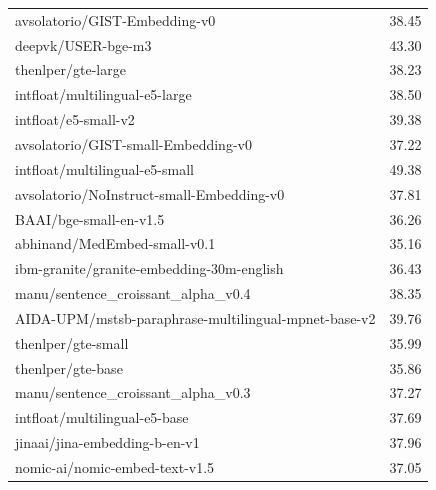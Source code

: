 \begin{xltabular}{\textwidth}{X c}
    avsolatorio/GIST-Embedding-v0                                        & 38.45                    \\
    deepvk/USER-bge-m3                                                   & 43.30                    \\
    thenlper/gte-large                                                   & 38.23                    \\
    intfloat/multilingual-e5-large                                       & 38.50                    \\
    intfloat/e5-small-v2                                                 & 39.38                    \\
    avsolatorio/GIST-small-Embedding-v0                                  & 37.22                    \\
    intfloat/multilingual-e5-small                                       & 49.38                    \\
    avsolatorio/NoInstruct-small-Embedding-v0                            & 37.81                    \\
    BAAI/bge-small-en-v1.5                                               & 36.26                    \\
    abhinand/MedEmbed-small-v0.1                                         & 35.16                    \\
    ibm-granite/granite-embedding-30m-english                            & 36.43                    \\
    manu/sentence\_croissant\_alpha\_v0.4                                & 38.35                    \\
    AIDA-UPM/mstsb-paraphrase-multilingual-mpnet-base-v2                 & 39.76                    \\
    thenlper/gte-small                                                   & 35.99                    \\
    thenlper/gte-base                                                    & 35.86                    \\
    manu/sentence\_croissant\_alpha\_v0.3                                & 37.27                    \\
    intfloat/multilingual-e5-base                                        & 37.69                    \\
    jinaai/jina-embedding-b-en-v1                                        & 37.96                    \\
    nomic-ai/nomic-embed-text-v1.5                                       & 37.05                    \\

\end{xltabular}
